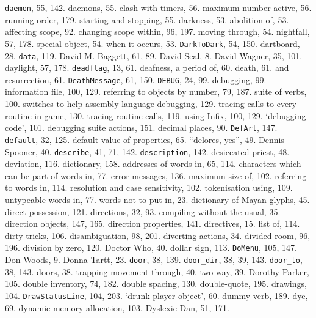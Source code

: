 {{{{{\tt daemon}}, 55, 142.
daemons, 55.
\quad  clash with timers, 56.
\quad  maximum number active, 56.
\quad  running order, 179.
\quad  starting and stopping, 55.
darkness, 53.
\quad  abolition of, 53.
\quad  affecting scope, 92.
\quad  changing scope within, 96, 197.
\quad  moving through, 54.
\quad  nightfall, 57, 178.
\quad  special object, 54.
\quad  when it occurs, 53.
{{\tt DarkToDark}}, 54, 150.
dartboard, 28.
{{\tt data}}, 119.
David M. Baggett, 61, 89.
David Seal, 8.
David Wagner, 35, 101.
daylight, 57, 178.
{{\tt deadflag}}, 13, 61.
deafness, a period of, 60.
death, 61.
\quad  and resurrection, 61.
{{\tt DeathMessage}}, 61, 150.
{{\tt DEBUG}}, 24, 99.
debugging, 99.
\quad  information file, 100, 129.
\quad  referring to objects by number, 79, 187.
\quad  suite of verbs, 100.
\quad  switches to help assembly language debugging, 129.
\quad  tracing calls to every routine in game, 130.
\quad  tracing routine calls, 119.
\quad  using Infix, 100, 129.
`debugging code', 101.
debugging suite actions, 151.
decimal places, 90.
{{\tt DefArt}}, 147.
{{\tt default}}, 32, 125.
default value of properties, 65.
``delores, yes'', 49.
Dennis Spooner, 40.
{{\tt describe}}, 41, 71, 142.
{{\tt description}}, 142.
desiccated priest, 48.
deviation, 116.
dictionary, 158.
\quad  addresses of words in, 65, 114.
\quad  characters which can be part of words in, 77.
\quad  error messages, 136.
\quad  maximum size of, 102.
\quad  referring to words in, 114.
\quad  resolution and case sensitivity, 102.
\quad  tokenisation using, 109.
\quad  untypeable words in, 77.
\quad  words not to put in, 23.
dictionary of Mayan glyphs, 45.
direct possession, 121.
directions, 32, 93.
\quad  compiling without the usual, 35.
\quad  direction objects, 147, 165.
\quad  direction properties, 141.
directives, 15.
\quad  list of, 114.
dirty tricks, 106.
disambiguation, 98, 201.
diverting actions, 34.
divided room, 96, 196.
division by zero, 120.
Doctor Who, 40.
dollar sign, 113.
{{\tt DoMenu}}, 105, 147.
Don Woods, 9.
Donna Tartt, 23.
{{\tt door}}, 38, 139.
{{\tt door\_dir}}, 38, 39, 143.
{{\tt door\_to}}, 38, 143.
doors, 38.
\quad  trapping movement through, 40.
\quad  two-way, 39.
Dorothy Parker, 105.
double inventory, 74, 182.
double spacing, 130.
double-quote, 195.
drawings, 104.
{{\tt DrawStatusLine}}, 104, 203.
`drunk player object', 60.
dummy verb, 189.
dye, 69.
dynamic memory allocation, 103.
Dyslexic Dan, 51, 171.

}}}
